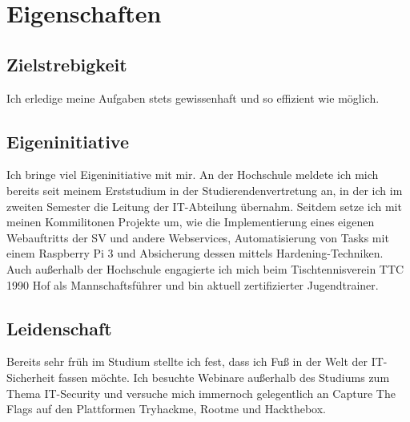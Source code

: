 \section{Eigenschaften}

\subsection{Zielstrebigkeit}
Ich erledige meine Aufgaben stets gewissenhaft und so effizient wie möglich.

\subsection{Eigeninitiative}

Ich bringe viel Eigeninitiative mit mir.
An der Hochschule meldete ich mich bereits seit meinem Erststudium in der Studierendenvertretung an,
in der ich im zweiten Semester die Leitung der IT-Abteilung übernahm.
Seitdem setze ich mit meinen Kommilitonen Projekte um, wie die Implementierung eines eigenen Webauftritts der SV und andere Webservices,
Automatisierung von Tasks mit einem Raspberry Pi 3 und Absicherung dessen mittels Hardening-Techniken. \newline
Auch außerhalb der Hochschule engagierte ich mich beim Tischtennisverein TTC 1990 Hof als Mannschaftsführer und bin aktuell zertifizierter Jugendtrainer.

\subsection{Leidenschaft}
Bereits sehr früh im Studium stellte ich fest, dass ich Fuß in der Welt der IT-Sicherheit fassen möchte.
Ich besuchte Webinare außerhalb des Studiums zum Thema IT-Security und versuche mich
immernoch gelegentlich an Capture The Flags auf den Plattformen Tryhackme, Rootme und Hackthebox.
